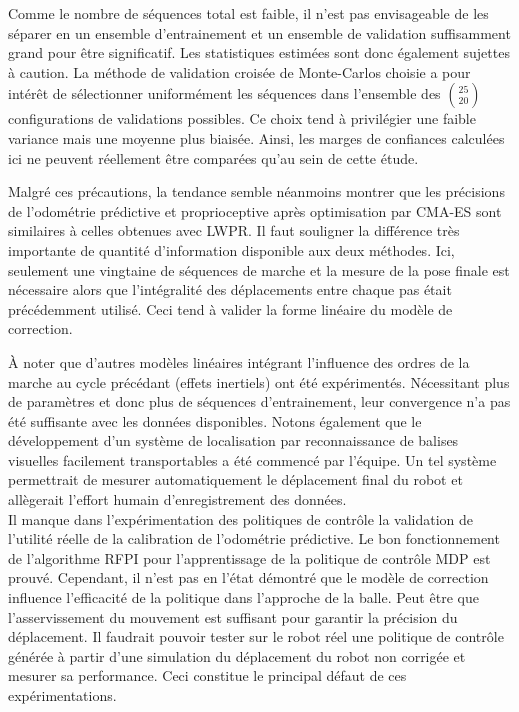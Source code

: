 Comme le nombre de séquences total est faible, il n'est pas envisageable
de les séparer en un ensemble d'entrainement et un ensemble de validation
suffisamment grand pour être significatif.
Les statistiques estimées sont donc également sujettes à caution.
La méthode de validation croisée de Monte-Carlos choisie a pour intérêt
de sélectionner uniformément les séquences dans l'ensemble des $25 \choose 20$ configurations 
de validations possibles.
Ce choix tend à privilégier une faible variance mais une moyenne plus biaisée.
Ainsi, les marges de confiances calculées ici ne peuvent réellement 
être comparées qu'au sein de cette étude.

Malgré ces précautions, la tendance semble néanmoins montrer que les précisions
de l'odométrie prédictive et proprioceptive après optimisation par CMA-ES 
sont similaires à celles obtenues avec LWPR.
Il faut souligner la différence très importante de quantité d'information disponible aux deux méthodes.
Ici, seulement une vingtaine de séquences de marche et la mesure de la pose finale est nécessaire
alors que l'intégralité des déplacements entre chaque pas était précédemment utilisé.
Ceci tend à valider la forme linéaire du modèle de correction.

À noter que d'autres modèles linéaires intégrant l'influence des ordres 
de la marche au cycle précédant (effets inertiels) ont été expérimentés.
Nécessitant plus de paramètres et donc plus de séquences d'entrainement, 
leur convergence n'a pas été suffisante avec les données disponibles.
Notons également que le développement d'un système de localisation par reconnaissance 
de balises visuelles facilement transportables a été commencé par l'équipe.
Un tel système permettrait de mesurer automatiquement le déplacement final du robot
et allègerait l'effort humain d'enregistrement des données.\\

Il manque dans l'expérimentation des politiques de contrôle la validation
de l'utilité réelle de la calibration de l'odométrie prédictive.
Le bon fonctionnement de l'algorithme RFPI pour l'apprentissage de la politique 
de contrôle MDP est prouvé.
Cependant, il n'est pas en l'état démontré que le modèle de correction
influence l'efficacité de la politique dans l'approche de la balle. 
Peut être que l'asservissement du mouvement est suffisant pour garantir
la précision du déplacement.
Il faudrait pouvoir tester sur le robot réel une politique de contrôle générée 
à partir d'une simulation du déplacement du robot non corrigée et mesurer 
sa performance.
Ceci constitue le principal défaut de ces expérimentations.

